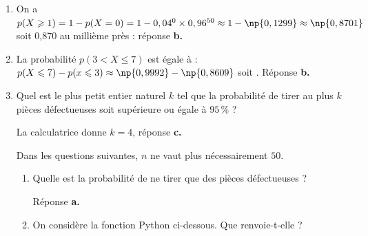 \begin{enumerate}
\item %
On a $p(X\geqslant 1) = 1 - p(X = 0) = 1 - 0,04^0 \times 0,96^{50} \approx 1 - \np{0,1299} \approx \np{0,8701}$ soit 0,870 au millième près : réponse \textbf{b.~~}

\item La probabilité $p(3 < X \leqslant 7)$ est égale à :
$p(X \leqslant 7) - p(x \leqslant 3) \approx \np{0,9992} - \np{0,8609}$ soit . Réponse \textbf{b.~~}
\item Quel est le plus petit entier naturel $k$ tel que la probabilité de tirer au plus $k$ pièces défectueuses soit supérieure ou égale à $95\,\%$ ?

La calculatrice donne $k = 4$, réponse \textbf{c.}

Dans les questions suivantes, $n$ ne vaut plus nécessairement $50$.

\begin{enumerate}[resume]
\item Quelle est la probabilité de ne tirer que des pièces défectueuses ?

Réponse \textbf{a.}
\item On considère la fonction Python ci-dessous. Que renvoie-t-elle ?


\end{enumerate}
\end{enumerate}
